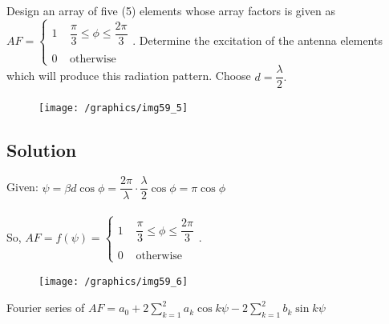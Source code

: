 \begin{exmp}
Design an array of five (5) elements whose array factors is given as\\
$ AF = \begin{cases}
1 \; \; \; \; \dfrac{\pi}{3} \leq \phi \leq \dfrac{2\pi}{3}\\
\\
0 \; \; \; \; \text{otherwise}
\end{cases}$.
Determine the excitation of the antenna elements which will produce this radiation pattern. Choose $d = \dfrac{\lambda}{2}.$
\begin{figure}[h]
\centering
\texttt{[image: /graphics/img59\_5]}
\label{fig:fig-5}
\end{figure}

\subsection{\centering Solution}
Given: $\psi = \beta d \cos\phi = \dfrac{2\pi}{\lambda} \cdot \dfrac{\lambda}{2} \cos\phi = \pi\cos\phi$\\
\\
So, $AF = f(\psi) =\begin{cases}
1 \; \; \; \; \dfrac{\pi}{3} \leq \phi \leq \dfrac{2\pi}{3}\\
\\
0 \; \; \; \; \text{otherwise}
\end{cases}$. 
\begin{figure}[h]
\centering
\texttt{[image: /graphics/img59\_6]}
\label{fig:fig-6}
\end{figure}

Fourier series of $AF =
a_0 + 2 \sum_{k = 1}^{2}a_k\cos k\psi - 2 \sum_{k = 1}^{2}b_k\sin k\psi
\label{sum}
$


\end{exmp}
